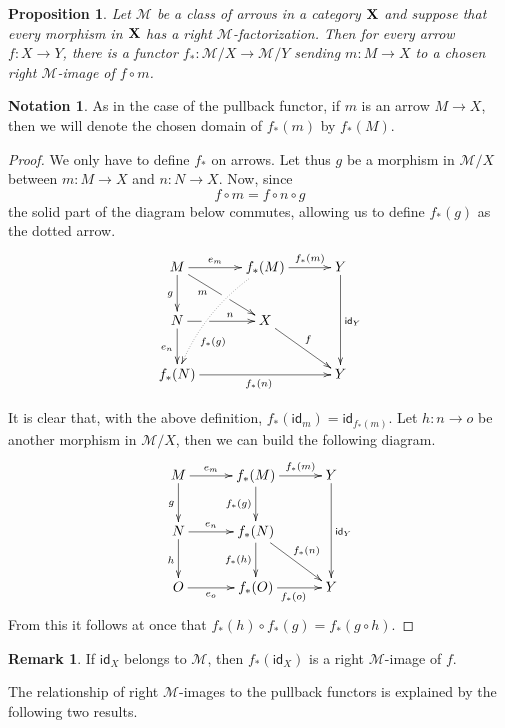 \documentclass[a4paper]{article}
\newcommand{\id}[1]{\mathsf{id}_{#1}}
\def\X{\textbf {\textup{X}}}
\newtheorem{proposition}[theorem]{Proposition}
\theoremstyle{definition}
\newtheorem*{notation}{Notation}
\newtheorem{remark}[theorem]{Remark}
\begin{document}
\begin{proposition}\label{prop:im}
Let $\mathcal{M}$ be a class of arrows in a category $\X$ and suppose that every morphism in $\X$ has a right $\mathcal{M}$-factorization. Then for every arrow $f\colon X\to Y$, there is a functor $f_*\colon \mathcal{M}/X\to \mathcal{M}/Y$ sending $m\colon M\to X$ to a chosen right $\mathcal{M}$-image of $f\circ m$.
\end{proposition}
\begin{notation}
	As in the case of the pullback functor, if $m$ is an arrow $M\to X$, then we will denote the chosen domain of $f_*(m)$ by $f_*(M)$.
\end{notation}
\begin{proof}
We only have to define $f_*$ on arrows. Let thus $g$ be a morphism in $\mathcal{M}/X$ between $m\colon M\to X$ and $n\colon N\to X$. Now, since \[f\circ m = f\circ n\circ g\] the solid part of the diagram below commutes, allowing us to define $f_*(g)$ as the dotted arrow.
\[\xymatrix@C=30pt{M \ar[dr]_(.35){m}|(.55)\hole\ar[r]^-{e_m} \ar[d]_{g}& f_*(M)  \ar@/_.3cm/@{.>}[ddl]^(.7){f_*(g)}\ar[r]^-{f_*(m)}& Y \ar[dd]^{\id{Y}}\\N \ar[d]_{e_n} \ar[r]|(.32)\hole^(.6){n} & X  \ar[dr]^{f}\\f_*(N) \ar[rr]_{f_*(n)}&& Y}\]

 It is clear that, with the above definition, $f_*(\id{m})=\id{f_*(m)}$. Let $h\colon n\to o$ be another morphism in $\mathcal{M}/X$, then we can build the following diagram.
\[\xymatrix@C=30pt{M \ar[r]^-{e_m} \ar[d]_{g}& f_*(M)  \ar[d]_{f_*(g)}\ar[r]^-{f_*(m)}& Y \ar[dd]^{\id{Y}}\\N \ar[r]^-{e_n} \ar[d]_{h} & f_*(N) \ar[d]_{f_*(h)} \ar[dr]^{f_*(n)}\\O\ar[r]_-{e_o}& f_*(O) \ar[r]_{f_*(o)}& Y}\]
From this it follows at once that $f_*(h)\circ f_*(g)=f_*(g\circ h)$.
\end{proof}
\begin{remark} If $\id{X}$ belongs to $\mathcal{M}$, then $f_*(\id{X})$ is a right $\mathcal{M}$-image of $f$.
\end{remark}

The relationship of right $\mathcal{M}$-images to the pullback functors is explained by the following two results.
\end{document}
